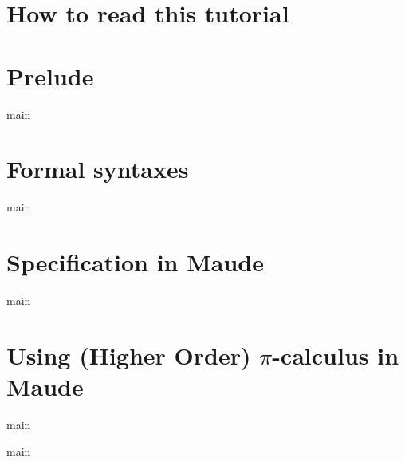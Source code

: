 \documentclass{article}
\begin{document}
\listoftodos

\maketitle

\newpage
\tableofcontents
\newpage

\section*{How to read this tutorial}


\newpage
\section{Prelude}
{main}

\newpage
\section{Formal syntaxes}
\label{formsyn}
{main}

\newpage
\section{Specification in Maude}
\label{using}
{main}

\newpage
\section{Using (Higher Order) \texorpdfstring{$\pi$}{pi}-calculus in Maude}
{main}

\newpage

\newpage

\newpage
\appendix
\newpage
{main}
\end{document}
